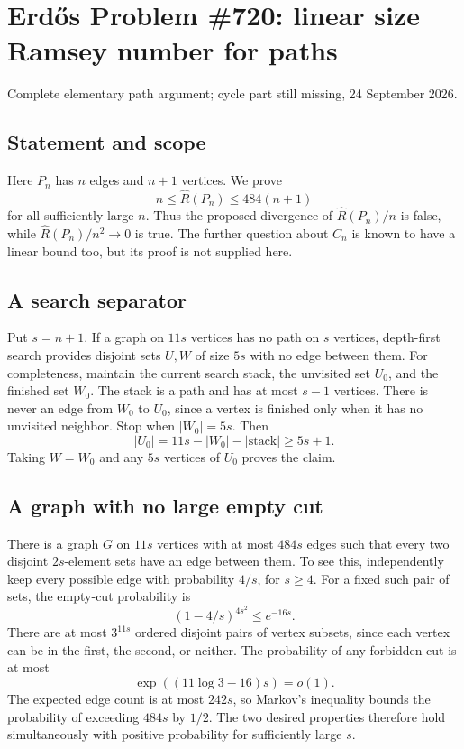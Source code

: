 \section{Erd\H{o}s Problem \#720: linear size Ramsey number for paths}
\noindent Complete elementary path argument; cycle part still missing, 24 September 2026.

\subsection*{Statement and scope}
Here $P_n$ has $n$ edges and $n+1$ vertices. We prove
\[
 n\leq\widehat R(P_n)\leq484(n+1)
\]
for all sufficiently large $n$. Thus the proposed divergence of $\widehat R(P_n)/n$ is false, while $\widehat R(P_n)/n^2\to0$ is true. The further question about $C_n$ is known to have a linear bound too, but its proof is not supplied here.

\subsection*{A search separator}
Put $s=n+1$. If a graph on $11s$ vertices has no path on $s$ vertices, depth-first search provides disjoint sets $U,W$ of size $5s$ with no edge between them.
For completeness, maintain the current search stack, the unvisited set $U_0$, and the finished set $W_0$. The stack is a path and has at most $s-1$ vertices. There is never an edge from $W_0$ to $U_0$, since a vertex is finished only when it has no unvisited neighbor.
Stop when $|W_0|=5s$. Then
\[
 |U_0|=11s-|W_0|-|\text{stack}|\geq5s+1.
\]
Taking $W=W_0$ and any $5s$ vertices of $U_0$ proves the claim.

\subsection*{A graph with no large empty cut}
There is a graph $G$ on $11s$ vertices with at most $484s$ edges such that every two disjoint $2s$-element sets have an edge between them. To see this, independently keep every possible edge with probability $4/s$, for $s\geq4$. For a fixed such pair of sets, the empty-cut probability is
\[
 (1-4/s)^{4s^2}\leq e^{-16s}.
\]
There are at most $3^{11s}$ ordered disjoint pairs of vertex subsets, since each vertex can be in the first, the second, or neither. The probability of any forbidden cut is at most
\[
 \exp((11\log3-16)s)=o(1).
\]
The expected edge count is at most $242s$, so Markov's inequality bounds the probability of exceeding $484s$ by $1/2$. The two desired properties therefore hold simultaneously with positive probability for sufficiently large $s$.

